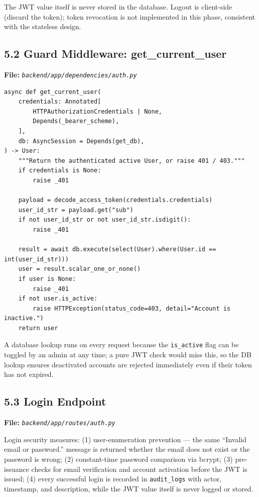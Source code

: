 \documentclass[11pt]{article}
\newcommand{\filelabel}[1]{\textbf{File:} \textit{\texttt{#1}}\par\vspace{2pt}}
\begin{document}
\vspace{4pt}
The JWT value itself is never stored in the database. Logout is client-side (discard the token); token revocation is not implemented in this phase, consistent with the stateless design.

\subsection{5.2 Guard Middleware: get\_current\_user}
\filelabel{backend/app/dependencies/auth.py}

\begin{lstlisting}
async def get_current_user(
    credentials: Annotated[
        HTTPAuthorizationCredentials | None,
        Depends(_bearer_scheme),
    ],
    db: AsyncSession = Depends(get_db),
) -> User:
    """Return the authenticated active User, or raise 401 / 403."""
    if credentials is None:
        raise _401

    payload = decode_access_token(credentials.credentials)
    user_id_str = payload.get("sub")
    if not user_id_str or not user_id_str.isdigit():
        raise _401

    result = await db.execute(select(User).where(User.id == int(user_id_str)))
    user = result.scalar_one_or_none()
    if user is None:
        raise _401
    if not user.is_active:
        raise HTTPException(status_code=403, detail="Account is inactive.")
    return user
\end{lstlisting}

A database lookup runs on every request because the \texttt{is\_active} flag can be toggled by an admin at any time; a pure JWT check would miss this, so the DB lookup ensures deactivated accounts are rejected immediately even if their token has not expired.

\subsection{5.3 Login Endpoint}
\filelabel{backend/app/routes/auth.py}

Login security measures: (1) user-enumeration prevention --- the same ``Invalid email or password.'' message is returned whether the email does not exist or the password is wrong; (2) constant-time password comparison via bcrypt; (3) pre-issuance checks for email verification and account activation before the JWT is issued; (4) every successful login is recorded in \texttt{audit\_logs} with actor, timestamp, and description, while the JWT value itself is never logged or stored.
\end{document}
